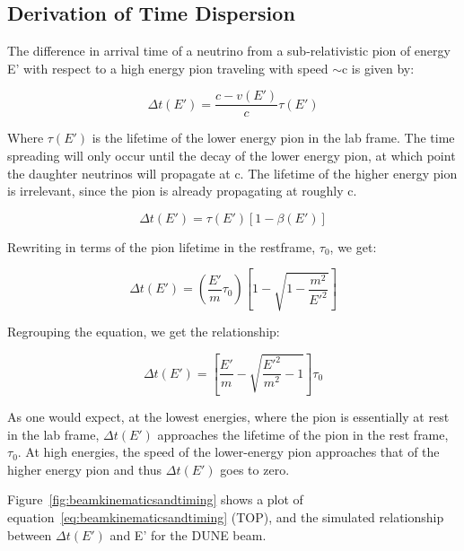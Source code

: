 \subsection{Derivation of Time Dispersion}

The difference in arrival time of a neutrino from a sub-relativistic
pion of energy E' with respect to a high energy pion traveling with
speed $\sim$c is given by:

\begin{equation}
\Delta t(E') = \frac{c - v(E')}{c} \tau (E')
\end{equation}

Where $\tau (E')$ is the lifetime of the lower energy pion in the lab
frame. The time spreading will only occur until the decay of the lower
energy pion, at which point the daughter neutrinos will propagate at
c. The lifetime of the higher energy pion is irrelevant, since the
pion is already propagating at roughly c.

\begin{equation}
\Delta t(E') = \tau (E') [1 - \beta (E')]
\end{equation}

Rewriting in terms of the pion lifetime in the restframe, $\tau_0$, we get:

\begin{equation}
\Delta t(E') = \left(\frac{E'}{m} \tau_0\right) \left[1 - \sqrt{ 1 - \frac{m^2}{E'^2}} \right] 
\end{equation}

Regrouping the equation, we get the relationship:

\begin{equation}
\Delta t(E') = \left[\frac{E'}{m} - \sqrt{ \frac{E'^2}{m^2} - 1}\right] \tau_0
\label{eq:beamkinematicsandtiming}
\end{equation}

As one would expect, at the lowest energies, where the pion is
essentially at rest in the lab frame, $\Delta t(E')$ approaches the
lifetime of the pion in the rest frame, $\tau_0$. At high energies,
the speed of the lower-energy pion approaches that of the higher
energy pion and thus $\Delta t(E')$ goes to zero.

Figure~\ref{fig:beamkinematicsandtiming} shows a plot of
equation~\ref{eq:beamkinematicsandtiming} (TOP), and the simulated
relationship between $\Delta t(E')$ and E' for the DUNE beam.

